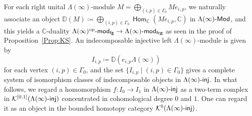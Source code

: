 \documentclass[12pt]{amsart}
\theoremstyle{definition}
\theoremstyle{remark}
\numberwithin{equation}{section}
\newcommand{\opname}[1]{\operatorname{\mathsf{#1}}}
\newcommand{\Hom}{\opname{Hom}}
\newcommand{\injc}{\mathchar`-\mathsf{inj}}
\begin{document}
For each right unital $\Lambda(\infty)$-module $M=\bigoplus_{(i,p)\in \Gamma_0} Me_{i,p}$, we naturally associate an object $\mathbb{D}(M)\coloneqq \bigoplus_{(i,p)\in \Gamma_0}\Hom_{\mathbb{C}}(Me_{i,p},\mathbb{C})$ in $\Lambda(\infty)\mathchar`-\mathsf{Mod}$, and this yields a $\mathbb{C}$-duality $\Lambda(\infty)^{\text{op}}\mathchar`-\mathsf{mod}_\mathsf{fg}\to \Lambda(\infty)\mathchar`-\mathsf{mod}_\mathsf{fcg}$  as seen in the proof of Proposition~\ref{Prop:KS}.
 An indecomposable injective left $\Lambda(\infty)$-module is given by
\begin{equation}\label{eq:injdef}
    I_{i,p} \coloneqq \mathbb{D}(e_{i,p}\Lambda(\infty))
\end{equation}
for each vertex $(i,p) \in \Gamma_{0}$, and the set $\{ I_{i,p} \mid (i,p) \in \Gamma_0\}$ gives a complete system of isomorphism classes of indecomposable objects in $\Lambda(\infty)\injc$.
In what follows, we regard a homomorphism $f \colon I_0 \to I_1$ in $\Lambda(\infty)\injc$ as a two-term complex in $\mathcal{K}^{[0,1]}(\Lambda(\infty)\injc)$ concentrated in cohomological degree $0$ and $1$. One can regard it as an object in the bounded homotopy category $\mathcal{K}^b(\Lambda(\infty)\injc)$.
\end{document}

